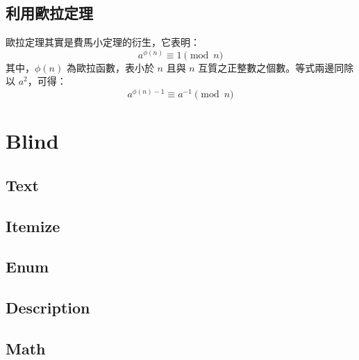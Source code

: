 \documentclass[12pt, a4paper]{article}
\begin{document}
\subsection{利用歐拉定理}

歐拉定理其實是費馬小定理的衍生，它表明：
\[a^{\phi(n)} \equiv 1 \pmod n\]
其中，$\phi(n)$ 為歐拉函數，表小於 $n$ 且與 $n$ 互質之正整數之個數。等式兩邊同除以 $a^2$，可得：
\[a^{\phi(n)-1} \equiv a^{-1} \pmod n\]

\section{Blind}

\subsection{Text}

\blindtext

\subsection{Itemize}

\blinditemize[5]

\subsection{Enum}

\blindenumerate[5]

\subsection{Description}

\blinddescription[5]

\subsection{Math}

\blindmathpaper
\end{document}
